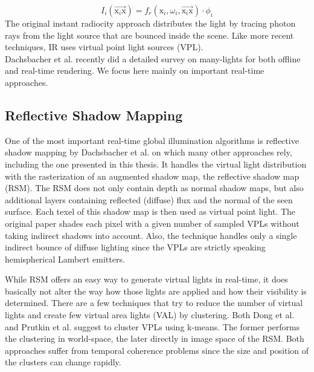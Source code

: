 \documentclass[thesis.tex]{subfiles}
\begin{document}
\begin{equation}
I_i(\overrightarrow{\mathrm{x}_i\mathrm{x}}) = f_r(\mathrm{x}_i, \omega_i, \overrightarrow{\mathrm{x}_i\mathrm{x}}) \cdot \phi_i
\end{equation}
The original instant radiocity approach distributes the light by tracing photon rays from the light source that are bounced inside the scene.
Like more recent techniques, IR uses virtual point light sources (VPL).
\\
Dachsbacher et al. \cite{bib:manylightssurvey2014} recently did a detailed survey on many-lights for both offline and real-time rendering.
We focus here mainly on important real-time approaches.

\subsection{Reflective Shadow Mapping} \label{sec:prev:rsm}
One of the most important real-time global illumination algorithms is reflective shadow mapping by Dachsbacher et al. \cite{bib:reflectiveshadowmaps} on which many other approaches rely, including the one presented in this thesis.
It handles the virtual light distribution with the rasterization of an augmented shadow map, the reflective shadow map (RSM).
The RSM does not only contain depth as normal shadow maps, but also additional layers containing reflected (diffuse) flux and the normal of the seen surface.
Each texel of this shadow map is then used as virtual point light.
The original paper shades each pixel with a given number of sampled VPLs without taking indirect shadows into account.
Also, the technique handles only a single indirect bounce of diffuse lighting since the VPLs are strictly speaking hemispherical Lambert emitters.

While RSM offers an easy way to generate virtual lights in real-time, it does basically not alter the way how those lights are applied and how their visibility is determined.
There are a few techniques that try to reduce the number of virtual lights and create few virtual area lights (VAL) by clustering.
Both Dong et al. \cite{bib:clusturedvisiblity:dong} and Prutkin et al. \cite{bib:clusturedvisiblity:prutkin} suggest to cluster VPLs using k-means.
The former performs the clustering in world-space, the later directly in image space of the RSM.
Both approaches suffer from temporal coherence problems since the size and position of the clusters can change rapidly.
\end{document}
